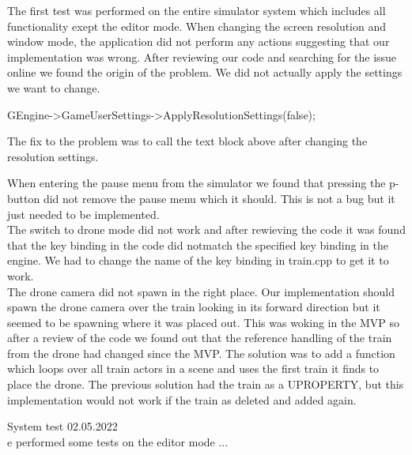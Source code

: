 The first test was performed on the entire simulator system which includes all functionality exept the editor mode. When changing the screen resolution and window mode, the application did not perform any actions suggesting that our implementation was wrong. After reviewing our code and searching for the issue online we found the origin of the problem. We did not actually apply the settings we want to change.

\begin{code}
	GEngine->GameUserSettings->ApplyResolutionSettings(false);
\end{code}

The fix to the problem was to call the text block above after changing the resolution settings.

When entering the pause menu from the simulator we found that pressing the p-button did not remove the pause menu which it should. This is not a bug but it just needed to be implemented. \\

The switch to drone mode did not work and after rewieving the code it was found that the key binding in the code did notmatch the specified key binding in the engine. We had to change the name of the key binding in train.cpp to get it to work. \\

The drone camera did not spawn in the right place. Our implementation should spawn the drone camera over the train looking in its forward direction but it seemed to be spawning where it was placed out. This was woking in the MVP so after a review of the code we found out that the reference handling of the train from the drone had changed since the MVP. The solution was to add a function which loops over all train actors in a scene and uses the first train it finds to place the drone. The previous solution had the train as a UPROPERTY, but this implementation would not work if the train as deleted and added again.


System test 02.05.2022 \\
e performed some tests on the editor mode ...




